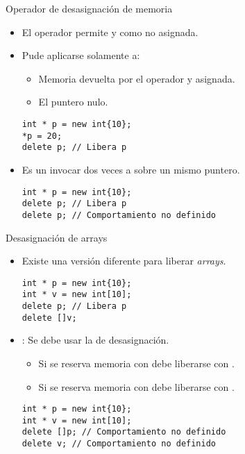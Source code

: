 \begin{frame}[t,fragile]{Operador de desasignación de memoria}
\begin{itemize}
  \item El operador  permite  
        y  como no asignada.
  \item Pude aplicarse solamente a:
    \begin{itemize}
      \item Memoria devuelta por el operador  y asignada.
      \item El puntero nulo.
    \end{itemize}
\begin{lstlisting}
int * p = new int{10};
*p = 20;
delete p; // Libera p
\end{lstlisting}

  \item Es un  invocar dos veces a  sobre un mismo puntero.
\begin{lstlisting}
int * p = new int{10};
delete p; // Libera p
delete p; // Comportamiento no definido
\end{lstlisting}
\end{itemize}
\end{frame}

\begin{frame}[t,fragile]{Desasignación de arrays}
\begin{itemize}
  \item Existe una versión diferente para liberar \emph{arrays}.
\begin{lstlisting}
int * p = new int{10};
int * v = new int[10];
delete p; // Libera p
delete []v;
\end{lstlisting}

  \item {}: Se debe usar la  de desasignación.
    \begin{itemize}
      \item Si se reserva memoria con  debe liberarse con .
      \item Si se reserva memoria con  debe liberarse con .
    \end{itemize}
\begin{lstlisting}
int * p = new int{10};
int * v = new int[10];
delete []p; // Comportamiento no definido
delete v; // Comportamiento no definido
\end{lstlisting}
\end{itemize}
\end{frame}


